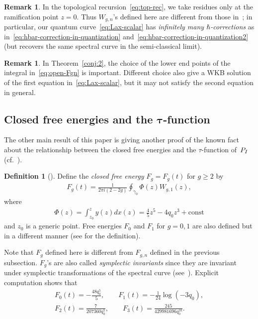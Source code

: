 \documentclass[11pt]{article}
\theoremstyle{definition}
\newtheorem{Def}[thm]{Definition}
\newtheorem{rem}[thm]{Remark}
\numberwithin{equation}{section}
\def\PI{P_{\rm I}}
\begin{document}
\begin{rem}
In the topological recursion~\eqref{eq:top-rec},
we take residues only at the ramif\/ication point $z = 0$.
Thus $W_{g,n}$'s def\/ined here
are dif\/ferent from those in~\cite{DM14-2};
in particular, our quantum curve~\eqref{eq:Lax-scalar}
has {\em infinitely many $\hbar$-corrections} as in~\eqref{eq:hbar-correction-in-quantization} and~\eqref{eq:hbar-correction-in-quantization2}
(but recovers the same spectral curve in the semi-classical limit).
\end{rem}

\begin{rem}
In Theorem~\ref{conj:2}, the choice of the lower end points
of the integral in~\eqref{eq:open-Fgn} is important.
Dif\/ferent choice also give a WKB solution of the f\/irst equation
in~\eqref{eq:Lax-scalar}, but it may not satisfy
the second equation in general.
\end{rem}



\subsection[Closed free energies and the $\tau$-function]{Closed free energies and the $\boldsymbol{\tau}$-function}

The other main result of this paper is giving
another proof of the known fact
about the relationship between the closed free energies
and the $\tau$-function of~$\PI$
(cf.~\cite{DGZJ,EO07}).


\begin{Def}[]
Def\/ine the {\em closed free energy}
$F_{g} = F_{g}(t)$ for $g \ge 2$ by
\begin{gather*}
F_{g}(t) = \frac{1}{2\pi i (2-2g)}
\oint_{\gamma_{0}} \Phi(z) W_{g,1}(z),
\end{gather*}
where
\begin{gather*}
\Phi(z) = \int^{z}_{z_{0}} y(z)dx(z)
  = \frac{4}{5}z^{5} - 4q_{0} z^{3} +
\text{const}
\end{gather*}
and $z_{0}$ is a generic point.
Free energies $F_{0}$ and $F_{1}$ for $g = 0, 1$
are also def\/ined but in a dif\/ferent manner
(see \cite[Sections~4.2.2 and~4.2.3]{EO07} for the def\/inition).
\end{Def}

Note that $F_g$ def\/ined here is dif\/ferent from $F_{g,n}$
def\/ined in the previous subsection.
$F_g$'s are also called {\it symplectic invariants}
since they are invariant under symplectic transformations
of the spectral curve (see~\cite{EO07}).
Explicit computation shows that
\begin{gather*}
F_{0}(t)   =   -\frac{48 q_{0}^{5}}{5},
\qquad
F_{1}(t)   =   -\frac{1}{24} \log(-3q_{0}), \\
F_{2}(t)   =   \frac{7}{207360 q_{0}^{5}},
\qquad
F_{3}(t)   =   \frac{245}{429981696 q_{0}^{10}}.
\end{gather*}
\end{document}
